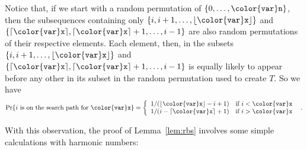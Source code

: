 \documentclass[10pt]{book}
\theoremstyle{plain}
\newcommand{\lemref}[1]{Lemma~\ref{lem:#1}}
\theoremstyle{definition}
\begin{document}
Notice that, if we start with a random permutation of $\{0,\ldots,\ensuremath{\mathtt{{\color{var}n}}}\}$,
then the subsequences containing only $\{i,i+1,\ldots,\lfloor\ensuremath{\mathtt{{\color{var}x}}}\rfloor\}$
and $\{\lceil\ensuremath{\mathtt{{\color{var}x}}}\rceil, \lceil\ensuremath{\mathtt{{\color{var}x}}}\rceil+1,\ldots,i-1\}$ are also random
permutations of their respective elements.  Each element, then, in the
subsets $\{i,i+1,\ldots,\lfloor\ensuremath{\mathtt{{\color{var}x}}}\rfloor\}$ and $\{\lceil\ensuremath{\mathtt{{\color{var}x}}}\rceil,
\lceil\ensuremath{\mathtt{{\color{var}x}}}\rceil+1,\ldots,i-1\}$ is equally likely to appear before
any other in its subset in the random permutation used to create $T$.
So we have
\[
  \Pr\{\mbox{$i$ is on the search path for \ensuremath{\mathtt{{\color{var}x}}}}\}
  = \left\{ \begin{array}{ll}
     1/(\lfloor\ensuremath{\mathtt{{\color{var}x}}}\rfloor-i+1) & \mbox{if $i < \ensuremath{\mathtt{{\color{var}x}}}$} \\
     1/(i-\lceil\ensuremath{\mathtt{{\color{var}x}}}\rceil+1) & \mbox{if $i > \ensuremath{\mathtt{{\color{var}x}}}$} 
     \end{array}\right . \enspace .
\]

With this observation, the proof of \lemref{rbs}
involves some simple calculations with harmonic numbers:
\end{document}
